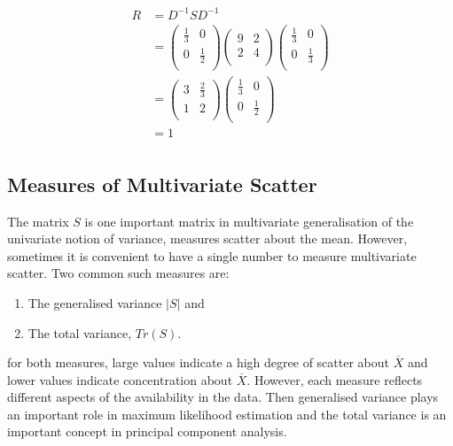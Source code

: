 \documentclass[11pt,a4paper]{article}
\theoremstyle{definition}
\begin{document}
\begin{align*}
R & = D^{-1}SD^{-1}\\
  & = 
\begin{pmatrix}
\frac{1}{3} & 0\\
0 & \frac{1}{2}\\
\end{pmatrix}
\begin{pmatrix}
9 & 2\\
2 & 4\\
\end{pmatrix}
\begin{pmatrix}
\frac{1}{3} & 0\\
0 & \frac{1}{3}\\
\end{pmatrix}\\
& = 
\begin{pmatrix}
3 & \frac{2}{3}\\
1 & 2\\
\end{pmatrix}
\begin{pmatrix}
\frac{1}{3} & 0\\
0 & \frac{1}{2}\\
\end{pmatrix}\\
& = 1\\
\end{align*}












\pagebreak





\subsection{Measures of Multivariate Scatter}
The matrix $S$ is one important matrix in multivariate generalisation of the univariate notion of variance, measures scatter about the mean. However, sometimes it is convenient to have a single number to measure multivariate scatter. Two common such measures are:
\begin{enumerate}
\item The generalised variance $|S|$ and 
\item The total variance, $Tr(S)$.
\end{enumerate} 

for both measures, large values indicate a high degree of scatter about $\overline{X}$ and lower values indicate concentration about $\overline{X}$. However, each measure reflects different aspects of the availability in the data. Then generalised variance plays an important role in maximum likelihood estimation and the  total variance is an important concept in principal component analysis.\\\\
\end{document}
